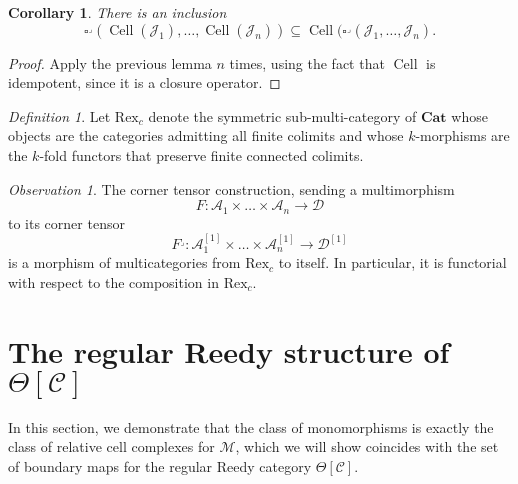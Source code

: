 \documentclass{amsart}
\numberwithin{equation}{section}
\theoremstyle{plain}   %
\newtheorem{cor}[subsection]{Corollary}
\theoremstyle{remark}
\newtheorem{obs}[subsection]{Observation}
\newtheorem{defn}[subsection]{Definition}
\theoremstyle{plain}
\newcommand{\Cat}{\ensuremath{\mathbf{Cat}}}
\newcommand{\C}{\ensuremath{\mathcal{C}}}
\begin{document}
\begin{cor} 
	There is an inclusion
	\[\square^\lrcorner(\operatorname{Cell}(\mathscr{J}_1),\dots,\operatorname{Cell}(\mathscr{J}_n)) \subseteq \operatorname{Cell}(\square^\lrcorner(\mathscr{J}_1,\dots,\mathscr{J}_n).\]
\end{cor}
\begin{proof} 
	Apply the previous lemma \(n\) times, using the fact that \(\operatorname{Cell}\) is idempotent, since it is a closure operator.
\end{proof}

\begin{defn} Let \(\mathrm{Rex}_c\) denote the symmetric sub-multi-category of \(\Cat\) whose objects are the categories admitting all finite colimits and whose \(k\)-morphisms are the \(k\)-fold functors that preserve finite connected colimits.
\end{defn}
\begin{obs}\label{cornertensorfunctoriality} The corner tensor construction, sending a multimorphism 
	\[F:\mathcal{A}_1\times\dots\times \mathcal{A}_n \to \mathcal{D}\] to its corner tensor
	\[F^\lrcorner:\mathcal{A}_1^{[1]}\times\dots\times \mathcal{A}_n^{[1]} \to \mathcal{D}^{[1]}\] is a morphism of multicategories from \(\mathrm{Rex}_c\) to itself.  In particular, it is functorial with respect to the composition in \(\mathrm{Rex}_c\).
\end{obs}
\section{The regular Reedy structure of \(\Theta[\C]\)}\label{reedy}
In this section, we demonstrate that the class of monomorphisms is exactly the class of relative cell complexes for \(\mathscr{M}\), which we will show coincides with the set of boundary maps for the regular Reedy category \(\Theta[\C]\).  
\end{document}
